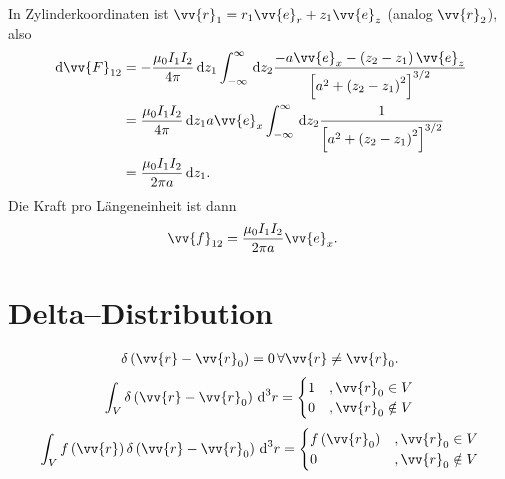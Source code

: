 \documentclass[a4paper,12pt]{article}
\newcommand{\td}{\,\text{d}}
\numberwithin{equation}{section}
\begin{document}
In Zylinderkoordinaten ist $\vv{r}_1=r_1\vv{e}_r+z_1\vv{e}_z$ (analog $\vv{r}_2$), also
\begin{align} 
        \td \vv{F}_{12}&=-\dfrac{\mu _0I_1I_2}{4\pi }\td z_1\int_{-\infty}^{\infty}\td z_2\dfrac{-a\vv{e}_x-\left(z_2-z_1\right)\vv{e}_z}{\left[a^2+\left(z_2-z_1\right)^2\right]^{3/2}}\\
                       &=\dfrac{\mu _0I_1I_2}{4\pi }\td z_1a\vv{e}_x\int_{-\infty}^{\infty}\td z_2\dfrac{1}{\left[a^2+\left(z_2-z_1\right)^2\right]^{3/2}}\\
                       &=\dfrac{\mu _0I_1I_2}{2\pi a}\td z_1
.\end{align} 
Die Kraft pro Längeneinheit ist dann
\begin{align} 
        \vv{f}_{12}&=\dfrac{\mu _0I_1I_2}{2\pi a}\vv{e}_x
.\end{align} 


\newpage
\section{Delta--Distribution}
\begin{align} 
        \delta \left(\vv{r}-\vv{r}_0\right)=0\,\forall \vv{r}\neq \vv{r}_0
.\end{align} 
\begin{align} 
        \int_{V}^{}\delta \left(\vv{r}-\vv{r}_0\right)\td ^3r=\begin{cases}
                1&,\vv{r}_0 \in V\\
                0&,\vv{r}_0 \notin V
        \end{cases}
\end{align} 
\begin{align} 
        \int_{V}^{}f\left(\vv{r}\right)\delta \left(\vv{r}-\vv{r}_0\right)\td ^3r=\begin{cases}
                f\left(\vv{r}_0\right)&,\vv{r}_0 \in V\\
                0&,\vv{r}_0 \notin V
        \end{cases}
\end{align} 


\newpage
\end{document}
